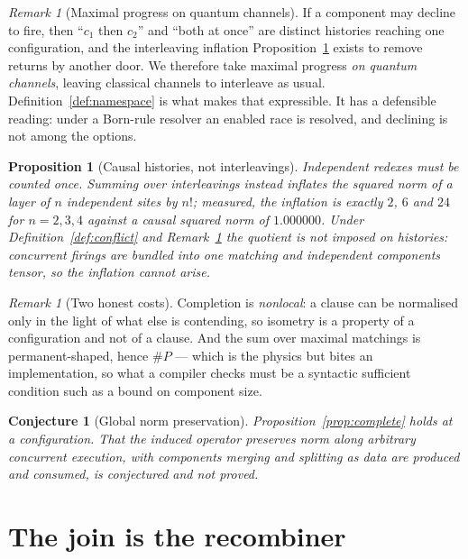 \documentclass[11pt,a4paper]{article}
\theoremstyle{plain}
\newtheorem{proposition}[theorem]{Proposition}
\newtheorem{conjecture}[theorem]{Conjecture}
\theoremstyle{definition}
\theoremstyle{remark}
\newtheorem{remark}[theorem]{Remark}
\begin{document}
\begin{remark}[Maximal progress on quantum channels]\label{rem:maxprog}
If a component may decline to fire, then ``$c_1$ then $c_2$'' and ``both at
once'' are distinct histories reaching one configuration, and the interleaving
inflation Proposition~\ref{prop:causal} exists to remove returns by another
door. We therefore take maximal progress \emph{on quantum channels}, leaving
classical channels to interleave as usual. Definition~\ref{def:namespace} is
what makes that expressible. It has a defensible reading: under a Born-rule
resolver an enabled race is resolved, and declining is not among the options.
\end{remark}

\begin{proposition}[Causal histories, not interleavings]\label{prop:causal}
Independent redexes must be counted once. Summing over interleavings instead
inflates the squared norm of a layer of $n$ independent sites by $n!$; measured,
the inflation is exactly $2$, $6$ and $24$ for $n = 2,3,4$ against a causal
squared norm of $1.000000$. Under Definition~\ref{def:conflict} and
Remark~\ref{rem:maxprog} the quotient is not imposed on histories: concurrent
firings are bundled into one matching and independent components tensor, so the
inflation cannot arise.
\end{proposition}

\begin{remark}[Two honest costs]\label{rem:costs}
Completion is \emph{nonlocal}: a clause can be normalised only in the light of
what else is contending, so isometry is a property of a configuration and not of
a clause. And the sum over maximal matchings is permanent-shaped, hence $\#P$
--- which is the physics \cite{AaronsonArkhipov} but bites an implementation, so
what a compiler checks must be a syntactic sufficient condition such as a bound
on component size.
\end{remark}

\begin{conjecture}[Global norm preservation]\label{conj:global}
Proposition~\ref{prop:complete} holds at a configuration. That the induced
operator preserves norm along arbitrary concurrent execution, with components
merging and splitting as data are produced and consumed, is conjectured and not
proved.
\end{conjecture}

\section{The join is the recombiner}\label{sec:erasure}
\end{document}
